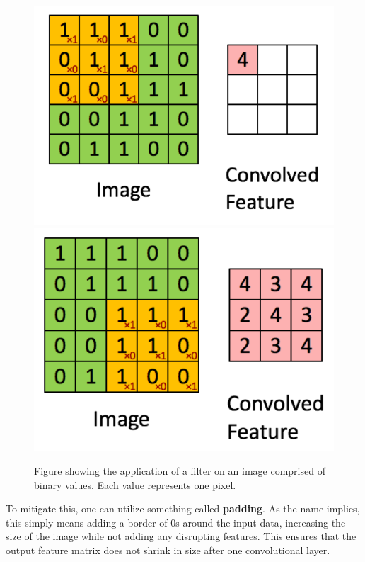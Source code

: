 \documentclass[10pt, twocolumn]{article}
\begin{document}
\begin{figure}[H]
    \centering
    \includegraphics[scale=0.3]{../figs/convlayer5.png}
    \includegraphics[scale=0.3]{../figs/convlayer4.png}
    \caption{Figure showing the application of a filter on an image comprised of binary values. Each value represents one pixel.}
    \label{fig:convlayer}
\end{figure}

To mitigate this, one can utilize something called \textbf{padding}. As the name implies, this simply means adding a border of $0$s around the input data, increasing the size of the image while not adding any disrupting features. This ensures that the output feature matrix does not shrink in size after one convolutional layer.
\end{document}
